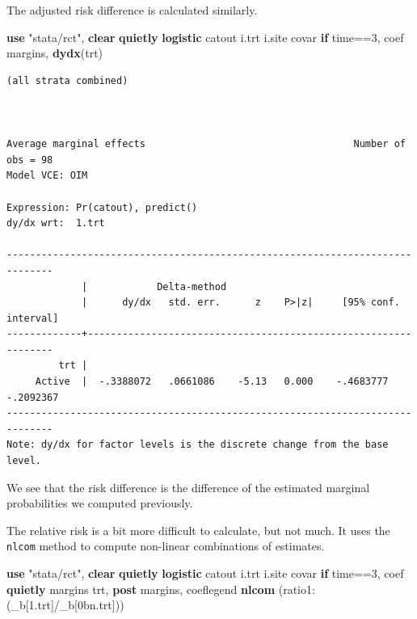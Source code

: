 \documentclass[
]{book}
\newenvironment{Shaded}{\begin{snugshade}}{\end{snugshade}}
\newcommand{\KeywordTok}[1]{\textcolor[rgb]{0.13,0.29,0.53}{\textbf{#1}}}
\newcommand{\NormalTok}[1]{#1}
\newcommand{\StringTok}[1]{\textcolor[rgb]{0.31,0.60,0.02}{#1}}
\begin{document}
The adjusted risk difference is calculated similarly.

\begin{Shaded}
\begin{Highlighting}[]
\KeywordTok{use} \StringTok{"stata/rct"}\NormalTok{, }\KeywordTok{clear} 
\KeywordTok{quietly} \KeywordTok{logistic}\NormalTok{ catout i.trt i.site covar  }\KeywordTok{if}\NormalTok{ time==3, coef}
\NormalTok{margins, }\KeywordTok{dydx}\NormalTok{(trt)}
\end{Highlighting}
\end{Shaded}

\begin{verbatim}
(all strata combined)



Average marginal effects                                    Number of obs = 98
Model VCE: OIM

Expression: Pr(catout), predict()
dy/dx wrt:  1.trt

------------------------------------------------------------------------------
             |            Delta-method
             |      dy/dx   std. err.      z    P>|z|     [95% conf. interval]
-------------+----------------------------------------------------------------
         trt |
     Active  |  -.3388072   .0661086    -5.13   0.000    -.4683777   -.2092367
------------------------------------------------------------------------------
Note: dy/dx for factor levels is the discrete change from the base level.
\end{verbatim}

We see that the risk difference is the difference of the estimated marginal probabilities we computed previously.

The relative risk is a bit more difficult to calculate, but not much. It uses the \texttt{nlcom} method to compute non-linear combinations of estimates.

\begin{Shaded}
\begin{Highlighting}[]
\KeywordTok{use} \StringTok{"stata/rct"}\NormalTok{, }\KeywordTok{clear} 
\KeywordTok{quietly} \KeywordTok{logistic}\NormalTok{ catout i.trt i.site covar  }\KeywordTok{if}\NormalTok{ time==3, coef}
\KeywordTok{quietly}\NormalTok{ margins trt, }\KeywordTok{post}
\NormalTok{margins, coeflegend}
\KeywordTok{nlcom}\NormalTok{ (ratio1: (\_b[1.trt]/\_b[0bn.trt]))}
\end{Highlighting}
\end{Shaded}
\end{document}

